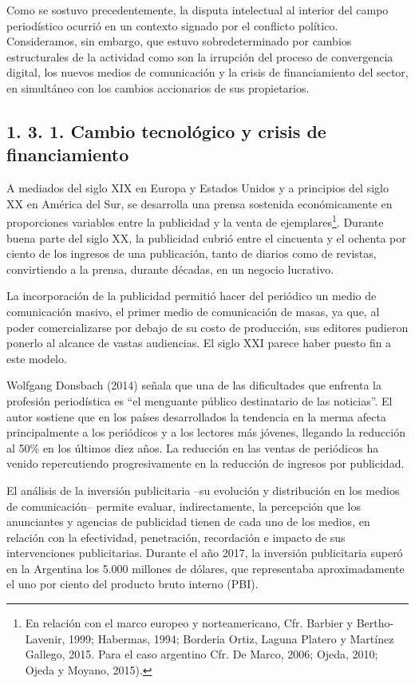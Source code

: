 {Como se sostuvo precedentemente, la disputa intelectual al interior del campo periodístico ocurrió en un contexto signado por el conflicto político. Consideramos, sin embargo, que estuvo sobredeterminado por cambios estructurales de la actividad como son la irrupción del proceso de convergencia digital, los nuevos medios de comunicación y la crisis de financiamiento del sector, en simultáneo con los cambios accionarios de sus propietarios.

\subsection{1. 3. 1. Cambio tecnológico y crisis de financiamiento}

A mediados del siglo XIX en Europa y Estados Unidos y a principios del siglo XX en América del Sur, se desarrolla una prensa sostenida económicamente en proporciones variables entre la publicidad y la venta de ejemplares\footnote{En relación con el marco europeo y norteamericano, Cfr. Barbier y Bertho-Lavenir, 1999; Habermas, 1994; Borderia Ortiz, Laguna Platero y Martínez Gallego, 2015. Para el caso argentino Cfr. De Marco, 2006; Ojeda, 2010; Ojeda y Moyano, 2015).}. Durante buena parte del siglo XX, la publicidad cubrió entre el cincuenta y el ochenta por ciento de los ingresos de una publicación, tanto de diarios como de revistas, convirtiendo a la prensa, durante décadas, en un negocio lucrativo.

La incorporación de la publicidad permitió hacer del periódico un medio de comunicación masivo, el primer medio de comunicación de masas, ya que, al poder comercializarse por debajo de su costo de producción, sus editores pudieron ponerlo al alcance de vastas audiencias. El siglo XXI parece haber puesto fin a este modelo.

Wolfgang Donsbach (2014) señala que una de las dificultades que enfrenta la profesión periodística es ``el menguante público destinatario de las noticias''. El autor sostiene que en los países desarrollados la tendencia en la merma afecta principalmente a los periódicos y a los lectores más jóvenes, llegando la reducción al 50\% en los últimos diez años. La reducción en las ventas de periódicos ha venido repercutiendo progresivamente en la reducción de ingresos por publicidad.

El análisis de la inversión publicitaria --su evolución y distribución en los medios de comunicación-- permite evaluar, indirectamente, la percepción que los anunciantes y agencias de publicidad tienen de cada uno de los medios, en relación con la efectividad, penetración, recordación e impacto de sus intervenciones publicitarias. Durante el año 2017, la inversión publicitaria superó en la Argentina los 5.000 millones de dólares, que representaba aproximadamente el uno por ciento del producto bruto interno (PBI).

}
